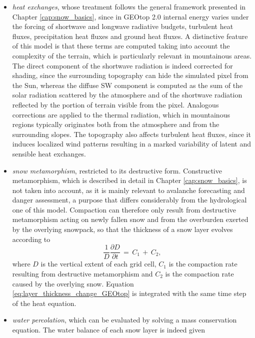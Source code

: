 \begin{itemize}[label=$\blacktriangleright$]
    \item \textit{heat exchanges}, whose treatment follows the general framework presented in Chapter \ref{cap:snow_basics}, since in GEOtop 2.0 internal 
    energy varies under the forcing of shortwave and longwave radiative budgets, turbulent heat fluxes, precipitation heat fluxes and ground heat 
    fluxes. A distinctive feature of this model is that these terms are computed taking into account the complexity of the terrain, which is particularly 
    relevant in mountainous areas. The direct component of the shortwave radiation is indeed corrected for shading, since the surrounding topography can 
    hide the simulated pixel from the Sun, whereas the diffuse SW component is computed as the sum of the solar radiation scattered by the atmosphere and 
    of the shortwave radiation reflected by the portion of terrain visible from the pixel. Analogous corrections are applied to the thermal radiation, 
    which in mountainous regions typically originates both from the atmosphere and from the surrounding slopes. The topography also affects turbulent heat 
    fluxes, since it induces localized wind patterns resulting in a marked variability of latent and sensible heat exchanges. 
    \item \textit{snow metamorphism}, restricted to its destructive form. Constructive metamorphism, which is described in detail in Chapter \ref{cap:snow_basics}, 
    is not taken into account, as it is mainly relevant to avalanche forecasting and danger assessment, a purpose that differs considerably from the 
    hydrological one of this model. Compaction can therefore only result from destructive metamorphism acting on newly fallen snow and from the overburden 
    exerted by the overlying snowpack, so that the thickness of a snow layer evolves according to 
    \begin{equation}
        \frac{1}{D}\frac{\partial D}{\partial t}\,=\,C_1\,+\,C_2,
        \label{eq:layer_thickness_change_GEOtop}
    \end{equation}
        where $D$ is the vertical extent of each grid cell, $C_1$ is the compaction rate resulting from destructive metamorphism and $C_2$ is the compaction 
    rate caused by the overlying snow. Equation \eqref{eq:layer_thickness_change_GEOtop} is integrated with the same time step of the heat equation.
    \item \textit{water percolation}, which can be evaluated by solving a mass conservation equation. The water balance of each snow layer is indeed given 

\end{itemize}
